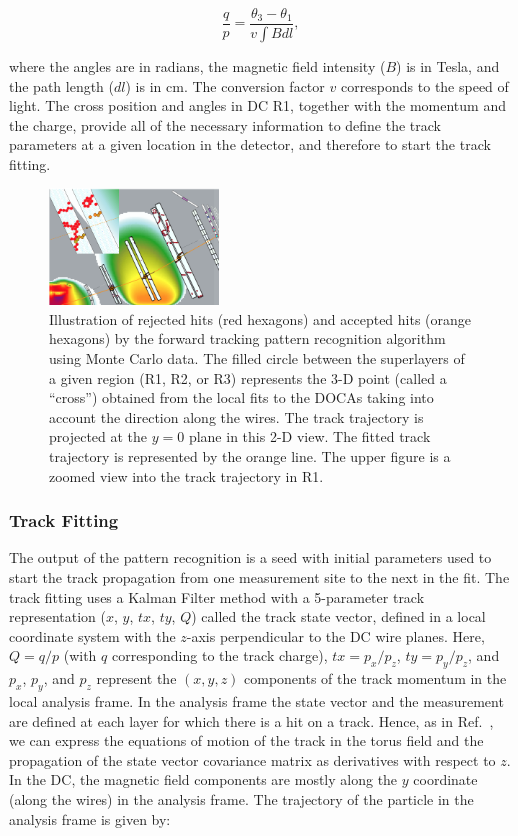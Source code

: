 \begin{equation}
  \frac{q}{p} = \frac{\theta_3 - \theta_1}{v\int{B dl}},
\end{equation}

\noindent
where the angles are in radians, the magnetic field intensity ($B$) is in Tesla, and the path length ($dl$) is in cm.
The conversion factor $v$ corresponds to the speed of light. The cross position and angles in DC R1, together with
the momentum and the charge, provide all of the necessary information to define the track parameters at a given
location in the detector, and therefore to start the track fitting.

\begin{figure}[t]
\centering
\includegraphics[width=0.4\textwidth]{pics/dcPattern13.png}
\caption{Illustration of rejected hits (red hexagons) and accepted hits (orange hexagons) by the forward tracking
  pattern recognition algorithm using Monte Carlo data. The filled circle between the superlayers of a given region (R1, R2, or R3) represents the 3-D point
  (called a ``cross'') obtained from the local fits to the DOCAs taking into account the direction along the wires. The track trajectory is projected at the $y=0$ plane in this 2-D view. The fitted track trajectory is represented by the orange line. The upper figure is a zoomed
  view into the track trajectory in R1.}
\label{fig:dcsegs}
\end{figure}

\subsubsection{Track Fitting}
\label{sec-trackfitting}

The output of the pattern recognition is a seed with initial parameters used to start the track propagation from one
measurement site to the next in the fit. The track fitting uses a Kalman Filter method with a 5-parameter track
representation ($x$, $y$, $tx$, $ty$, $Q$) called the track state vector, defined in a local coordinate system
with the $z$-axis perpendicular to the DC wire planes. Here, $Q=q/p$ (with $q$ corresponding to the track charge), $tx=p_x/p_z$, $ty=p_y/p_z$,
and $p_x$, $p_y$, and $p_z$ represent the $(x,y,z)$ components of the track momentum in the local analysis frame.
In the analysis frame the state vector and the measurement are defined at each layer for which there is a hit on a
track. Hence, as in Ref.~\cite{spiri}, we can express the equations of motion of the track in the torus field and the
propagation of the state vector covariance matrix as derivatives with respect to $z$. In the DC, the magnetic field
components are mostly along the $y$ coordinate (along the wires) in the analysis frame. The trajectory of the particle
in the analysis frame is given by:

